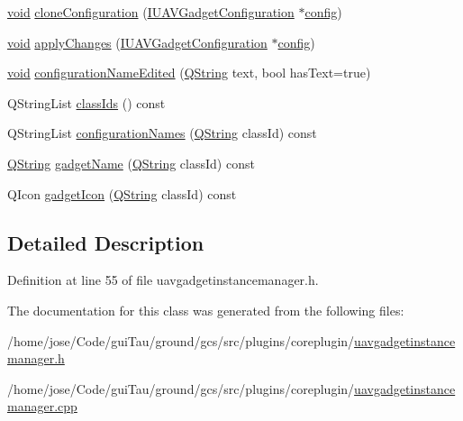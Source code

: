 \begin{DoxyCompactItemize}
\item 
\hyperlink{group___u_a_v_objects_plugin_ga444cf2ff3f0ecbe028adce838d373f5c}{void} \hyperlink{group___core_plugin_ga1caabd2ef4ff3c0727fad97d286bc4ed}{clone\-Configuration} (\hyperlink{class_core_1_1_i_u_a_v_gadget_configuration}{I\-U\-A\-V\-Gadget\-Configuration} $\ast$\hyperlink{deflate_8c_a4473b5227787415097004fd39f55185e}{config})
\item 
\hyperlink{group___u_a_v_objects_plugin_ga444cf2ff3f0ecbe028adce838d373f5c}{void} \hyperlink{group___core_plugin_ga7cd1bf8e5387d0c7cff1d5696266ddbb}{apply\-Changes} (\hyperlink{class_core_1_1_i_u_a_v_gadget_configuration}{I\-U\-A\-V\-Gadget\-Configuration} $\ast$\hyperlink{deflate_8c_a4473b5227787415097004fd39f55185e}{config})
\item 
\hyperlink{group___u_a_v_objects_plugin_ga444cf2ff3f0ecbe028adce838d373f5c}{void} \hyperlink{group___core_plugin_gafeb0a97fb20b6ddce2b951535339645e}{configuration\-Name\-Edited} (\hyperlink{group___u_a_v_objects_plugin_gab9d252f49c333c94a72f97ce3105a32d}{Q\-String} text, bool has\-Text=true)
\item 
Q\-String\-List \hyperlink{group___core_plugin_gab697e11f053f6a4e76f749a6aec7a7e9}{class\-Ids} () const 
\item 
Q\-String\-List \hyperlink{group___core_plugin_gadbf383c414223932af4f4a542dcc1005}{configuration\-Names} (\hyperlink{group___u_a_v_objects_plugin_gab9d252f49c333c94a72f97ce3105a32d}{Q\-String} class\-Id) const 
\item 
\hyperlink{group___u_a_v_objects_plugin_gab9d252f49c333c94a72f97ce3105a32d}{Q\-String} \hyperlink{group___core_plugin_gadc1d815c499816d254ba28f10bfcc382}{gadget\-Name} (\hyperlink{group___u_a_v_objects_plugin_gab9d252f49c333c94a72f97ce3105a32d}{Q\-String} class\-Id) const 
\item 
Q\-Icon \hyperlink{group___core_plugin_ga9fdb135aaf62b1ebefb587934d545b3d}{gadget\-Icon} (\hyperlink{group___u_a_v_objects_plugin_gab9d252f49c333c94a72f97ce3105a32d}{Q\-String} class\-Id) const 
\end{DoxyCompactItemize}


\subsection{Detailed Description}


Definition at line 55 of file uavgadgetinstancemanager.\-h.



The documentation for this class was generated from the following files\-:\begin{DoxyCompactItemize}
\item 
/home/jose/\-Code/gui\-Tau/ground/gcs/src/plugins/coreplugin/\hyperlink{uavgadgetinstancemanager_8h}{uavgadgetinstancemanager.\-h}\item 
/home/jose/\-Code/gui\-Tau/ground/gcs/src/plugins/coreplugin/\hyperlink{uavgadgetinstancemanager_8cpp}{uavgadgetinstancemanager.\-cpp}\end{DoxyCompactItemize}
